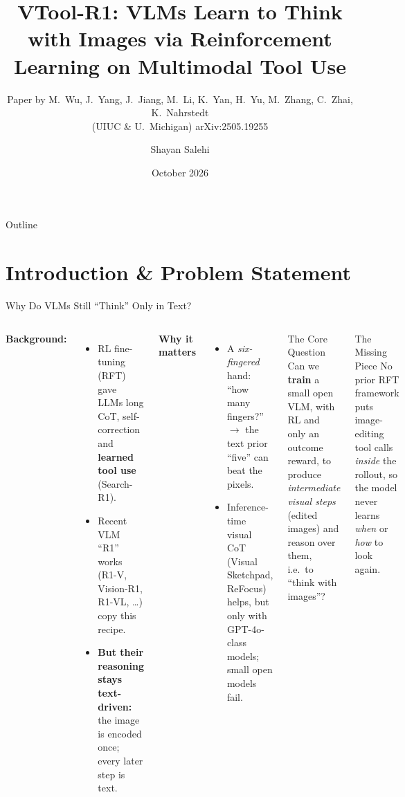 \documentclass[aspectratio=169]{beamer}
\title[IPL Lab]{VTool-R1: VLMs Learn to Think with Images via Reinforcement Learning on Multimodal Tool Use}
\subtitle{Paper by M.~Wu, J.~Yang, J.~Jiang, M.~Li, K.~Yan, H.~Yu, M.~Zhang, C.~Zhai, K.~Nahrstedt\\
  (UIUC \& U.~Michigan) \quad arXiv:2505.19255}
\author[Shayan Salehi]{Shayan Salehi}
\institute[SUT]{
  Department of Computer Engineering\\
  Sharif University of Technology\\
  IPL Lab
}
\date{October 2026}
\begin{document}
\begin{frame}
  \titlepage
\end{frame}

\begin{frame}{Outline}
  \tableofcontents
\end{frame}

\section{Introduction \& Problem Statement}

\begin{frame}{Why Do VLMs Still ``Think'' Only in Text?}
  \begin{columns}[T]
    \small
    \textbf{Background:}
    \begin{itemize}
      \item RL fine-tuning (RFT) gave LLMs long CoT, self-correction and \textbf{learned tool use} (Search-R1).
      \item Recent VLM ``R1'' works (R1-V, Vision-R1, R1-VL, \dots) copy this recipe.
      \item \textcolor{alertred}{\textbf{But their reasoning stays text-driven:}} the image is
            encoded once; every later step is text.
    \end{itemize}
    \vspace{0.1cm}
    \textbf{Why it matters}
    \begin{itemize}
      \item A \emph{six-fingered} hand: ``how many fingers?'' $\rightarrow$ the text prior ``five'' can beat the pixels.
      \item Inference-time visual CoT (Visual Sketchpad, ReFocus) helps, but
            \textcolor{alertred}{only with GPT-4o-class models}; small open models fail.
    \end{itemize}
    \begin{block}{The Core Question}
      \small Can we \textbf{train} a small open VLM, with RL and only an outcome reward,
      to produce \emph{intermediate visual steps} (edited images) and reason over them,
      i.e.\ to ``think with images''?
    \end{block}
    \vspace{0.2cm}
    \begin{alertblock}{The Missing Piece}
      \small No prior RFT framework puts image-editing tool calls \emph{inside} the rollout,
      so the model never learns \emph{when} or \emph{how} to look again.
    \end{alertblock}
  \end{columns}
\end{frame}
\end{document}
